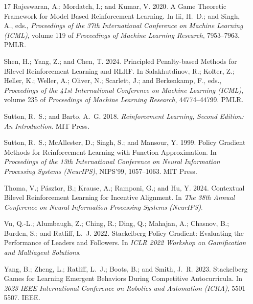 \documentclass[letterpaper]{article} %
\begin{document}
\begin{thebibliography}{17}
Rajeswaran, A.; Mordatch, I.; and Kumar, V. 2020.
\newblock A Game Theoretic Framework for Model Based Reinforcement Learning.
\newblock In Iii, H.~D.; and Singh, A., eds., \emph{Proceedings of the 37th International Conference on Machine Learning (ICML)}, volume 119 of \emph{Proceedings of Machine Learning Research}, 7953--7963. PMLR.

Shen, H.; Yang, Z.; and Chen, T. 2024.
\newblock Principled Penalty-based Methods for Bilevel Reinforcement Learning and {RLHF}.
\newblock In Salakhutdinov, R.; Kolter, Z.; Heller, K.; Weller, A.; Oliver, N.; Scarlett, J.; and Berkenkamp, F., eds., \emph{Proceedings of the 41st International Conference on Machine Learning (ICML)}, volume 235 of \emph{Proceedings of Machine Learning Research}, 44774--44799. PMLR.

Sutton, R.~S.; and Barto, A.~G. 2018.
\newblock \emph{Reinforcement Learning, Second Edition: An Introduction}.
\newblock MIT Press.

Sutton, R.~S.; McAllester, D.; Singh, S.; and Mansour, Y. 1999.
\newblock Policy Gradient Methods for Reinforcement Learning with Function Approximation.
\newblock In \emph{Proceedings of the 13th International Conference on Neural Information Processing Systems (NeurIPS)}, NIPS'99, 1057–1063. MIT Press.

Thoma, V.; Pásztor, B.; Krause, A.; Ramponi, G.; and Hu, Y. 2024.
\newblock Contextual Bilevel Reinforcement Learning for Incentive Alignment.
\newblock In \emph{The 38th Annual Conference on Neural Information Processing Systems (NeurIPS)}.

Vu, Q.-L.; Alumbaugh, Z.; Ching, R.; Ding, Q.; Mahajan, A.; Chasnov, B.; Burden, S.; and Ratliff, L.~J. 2022.
\newblock Stackelberg Policy Gradient: Evaluating the Performance of Leaders and Followers.
\newblock In \emph{ICLR 2022 Workshop on Gamification and Multiagent Solutions}.

Yang, B.; Zheng, L.; Ratliff, L.~J.; Boots, B.; and Smith, J.~R. 2023.
\newblock Stackelberg Games for Learning Emergent Behaviors During Competitive Autocurricula.
\newblock In \emph{2023 IEEE International Conference on Robotics and Automation (ICRA)}, 5501--5507. IEEE.


\end{thebibliography}
\end{document}
